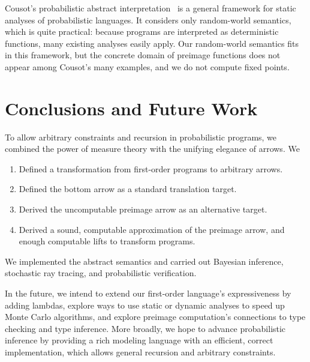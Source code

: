 \documentclass{llncs}
\begin{document}
Cousot's probabilistic abstract interpretation~\cite{cit:cousot-2012esop-prob} is a general framework for static analyses of probabilistic languages.
It considers only random-world semantics, which is quite practical: because programs are interpreted as deterministic functions, many existing analyses easily apply.
Our random-world semantics fits in this framework, but the concrete domain of preimage functions does not appear among Cousot's many examples, and we do not compute fixed points.



\section{Conclusions and Future Work}

To allow arbitrary constraints and recursion in probabilistic programs, we combined the power of measure theory with the unifying elegance of arrows. We
\begin{enumerate}
	\item Defined a transformation from first-order programs to arbitrary arrows.
	\item Defined the bottom arrow as a standard translation target.
	\item Derived the uncomputable preimage arrow as an alternative target.
	\item Derived a sound, computable approximation of the preimage arrow, and enough computable lifts to transform programs.
\end{enumerate}
We implemented the abstract semantics and carried out Bayesian inference, stochastic ray tracing, and probabilistic verification.

In the future, we intend to extend our first-order language's expressiveness by adding lambdas, explore ways to use static or dynamic analyses to speed up Monte Carlo algorithms, and explore preimage computation's connections to type checking and type inference.
More broadly, we hope to advance probabilistic inference by providing a rich modeling language with an efficient, correct implementation, which allows general recursion and arbitrary constraints.

\end{document}
